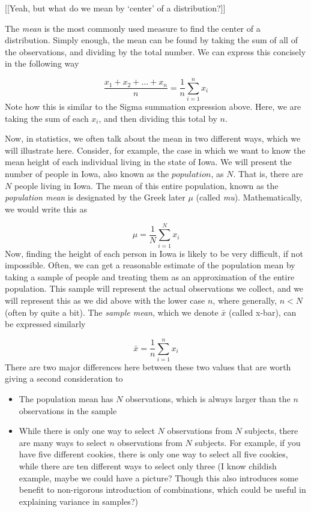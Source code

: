 \documentclass[
]{book}
\providecommand{\tightlist}{%
  \setlength{\itemsep}{0pt}\setlength{\parskip}{0pt}}
\theoremstyle{definition}
\theoremstyle{definition}
\theoremstyle{definition}
\theoremstyle{remark}
\begin{document}
{[}{[}Yeah, but what do we mean by `center' of a distribution?{]}{]}

The \emph{mean} is the most commonly used measure to find the center of a distribution. Simply enough, the mean can be found by taking the sum of all of the observations, and dividing by the total number. We can express this concisely in the following way

\[
\frac{x_1 + x_2 + \dots + x_n}{n} = \frac1n \sum_{i=1}^n x_i
\]
Note how this is similar to the Sigma summation expression above. Here, we are taking the sum of each \(x_i\), and then dividing this total by \(n\).

Now, in statistics, we often talk about the mean in two different ways, which we will illustrate here. Consider, for example, the case in which we want to know the mean height of each individual living in the state of Iowa. We will present the number of people in Iowa, also known as the \(population\), as \(N\). That is, there are \(N\) people living in Iowa. The mean of this entire population, known as the \emph{population mean} is designated by the Greek later \(\mu\) (called \emph{mu}). Mathematically, we would write this as

\[
\mu = \frac1N \sum_{i=1}^N x_i
\]
Now, finding the height of each person in Iowa is likely to be very difficult, if not impossible. Often, we can get a reasonable estimate of the population mean by taking a sample of people and treating them as an approximation of the entire population. This sample will represent the actual observations we collect, and we will represent this as we did above with the lower case \(n\), where generally, \(n < N\) (often by quite a bit). The \emph{sample mean}, which we denote \(\bar{x}\) (called x-bar), can be expressed similarly

\[
\bar{x} = \frac1n \sum_{i=1}^n x_i
\]
There are two major differences here between these two values that are worth giving a second consideration to

\begin{itemize}
\tightlist
\item
  The population mean has \(N\) observations, which is always larger than the \(n\) observations in the sample
\item
  While there is only one way to select \(N\) observations from \(N\) subjects, there are many ways to select \(n\) observations from \(N\) subjects. For example, if you have five different cookies, there is only one way to select all five cookies, while there are ten different ways to select only three (I know childish example, maybe we could have a picture? Though this also introduces some benefit to non-rigorous introduction of combinations, which could be useful in explaining variance in samples?)
\end{itemize}
\end{document}
